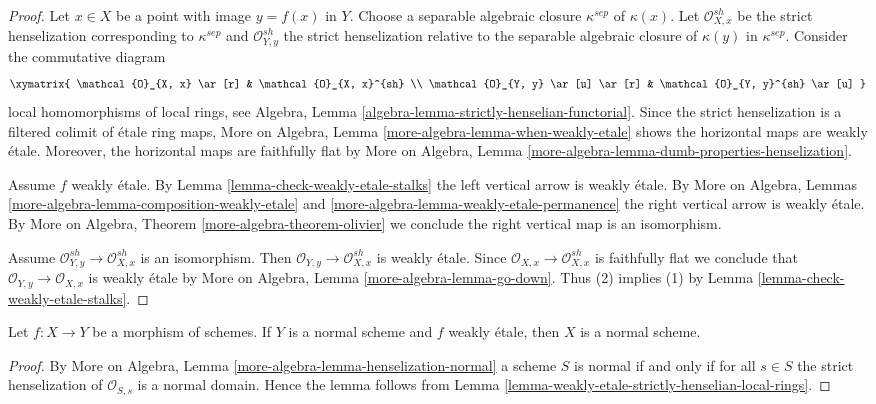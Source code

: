 \begin{proof}
Let $x \in X$ be a point with image $y = f(x)$ in $Y$.
Choose a separable algebraic closure $\kappa^{sep}$ of $\kappa(x)$.
Let $\mathcal{O}_{X, x}^{sh}$ be the strict henselization
corresponding to $\kappa^{sep}$ and $\mathcal{O}_{Y, y}^{sh}$
the strict henselization relative to the separable algebraic
closure of $\kappa(y)$ in $\kappa^{sep}$.
Consider the commutative diagram
$$
\xymatrix{
\mathcal{O}_{X, x} \ar[r] & \mathcal{O}_{X, x}^{sh} \\
\mathcal{O}_{Y, y} \ar[u] \ar[r] & \mathcal{O}_{Y, y}^{sh} \ar[u]
}
$$
local homomorphisms of local rings, see
Algebra, Lemma \ref{algebra-lemma-strictly-henselian-functorial}.
Since the strict henselization is a filtered colimit of \'etale
ring maps, More on Algebra, Lemma \ref{more-algebra-lemma-when-weakly-etale}
shows the horizontal maps are weakly \'etale.
Moreover, the horizontal maps are faithfully flat by
More on Algebra, Lemma \ref{more-algebra-lemma-dumb-properties-henselization}.

\medskip\noindent
Assume $f$ weakly \'etale. By Lemma \ref{lemma-check-weakly-etale-stalks}
the left vertical arrow is weakly \'etale. By
More on Algebra, Lemmas \ref{more-algebra-lemma-composition-weakly-etale} and
\ref{more-algebra-lemma-weakly-etale-permanence}
the right vertical arrow is weakly \'etale. By
More on Algebra, Theorem \ref{more-algebra-theorem-olivier}
we conclude the right vertical map is an isomorphism.

\medskip\noindent
Assume $\mathcal{O}_{Y, y}^{sh} \to \mathcal{O}_{X, x}^{sh}$ is an isomorphism.
Then $\mathcal{O}_{Y, y} \to \mathcal{O}_{X, x}^{sh}$ is weakly \'etale.
Since $\mathcal{O}_{X, x} \to \mathcal{O}_{X, x}^{sh}$ is faithfully
flat we conclude that $\mathcal{O}_{Y, y} \to \mathcal{O}_{X, x}$
is weakly \'etale by
More on Algebra, Lemma \ref{more-algebra-lemma-go-down}.
Thus (2) implies (1) by Lemma \ref{lemma-check-weakly-etale-stalks}.
\end{proof}

\begin{lemma}
\label{lemma-normal-goes-up}
Let $f : X \to Y$ be a morphism of schemes. If $Y$ is a normal scheme
and $f$ weakly \'etale, then $X$ is a normal scheme.
\end{lemma}

\begin{proof}
By More on Algebra, Lemma \ref{more-algebra-lemma-henselization-normal}
a scheme $S$ is normal if and only if for all $s \in S$
the strict henselization of $\mathcal{O}_{S, s}$ is a normal domain.
Hence the lemma follows from
Lemma \ref{lemma-weakly-etale-strictly-henselian-local-rings}.
\end{proof}

